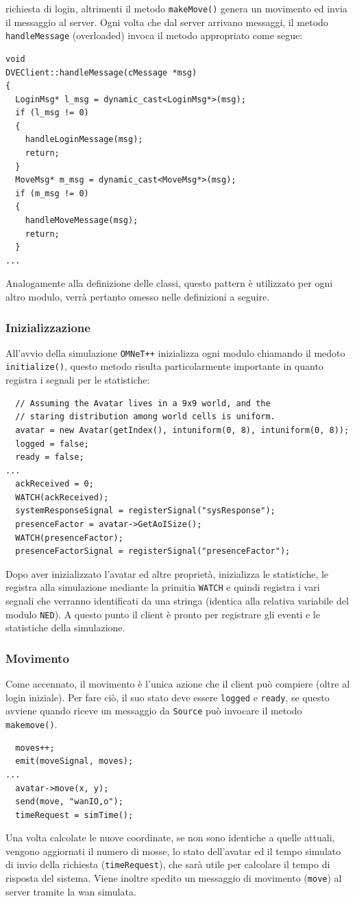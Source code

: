 \documentclass[a4paper, 11pt, oneside]{book}
\newcommand{\files}[1]{\texttt{#1}}
\theoremstyle{definition}
\theoremstyle{remark}
\begin{document}
richiesta di login, altrimenti il metodo \texttt{makeMove()} genera un movimento
ed invia il messaggio al server. Ogni volta che dal server arrivano messaggi,
il metodo \files{handleMessage} (overloaded) invoca il metodo appropriato
come segue:
\begin{lstlisting}
void
DVEClient::handleMessage(cMessage *msg)
{
  LoginMsg* l_msg = dynamic_cast<LoginMsg*>(msg);
  if (l_msg != 0)
  {
    handleLoginMessage(msg);
    return;
  }
  MoveMsg* m_msg = dynamic_cast<MoveMsg*>(msg);
  if (m_msg != 0)
  {
    handleMoveMessage(msg);
    return;
  }
...
\end{lstlisting}
Analogamente alla definizione delle classi, questo pattern è utilizzato per ogni
altro modulo, verrà pertanto omesso nelle definizioni a seguire.
\subsubsection{Inizializzazione}
All'avvio della simulazione \texttt{OMNeT++} inizializza ogni modulo chiamando
il medoto \texttt{initialize()}, questo metodo risulta particolarmente
importante in quanto registra i segnali per le statistiche:
\begin{lstlisting}
  // Assuming the Avatar lives in a 9x9 world, and the
  // staring distribution among world cells is uniform.
  avatar = new Avatar(getIndex(), intuniform(0, 8), intuniform(0, 8));
  logged = false;
  ready = false;
...
  ackReceived = 0;
  WATCH(ackReceived);
  systemResponseSignal = registerSignal("sysResponse");
  presenceFactor = avatar->GetAoISize();
  WATCH(presenceFactor);
  presenceFactorSignal = registerSignal("presenceFactor");
\end{lstlisting}
Dopo aver inizializzato l'avatar ed altre proprietà, inizializza le statistiche,
le registra alla simulazione mediante la primitia \texttt{WATCH} e quindi
registra i vari segnali che verranno identificati da una stringa (identica
alla relativa variabile del modulo \texttt{NED}). A questo punto il client è
pronto per registrare gli eventi e le statistiche della simulazione.

\subsubsection{Movimento}
Come accennato, il movimento è l'unica azione che il client può compiere
(oltre al login iniziale). Per fare ciò, il suo stato deve essere
\texttt{logged} e \texttt{ready}, se questo avviene quando riceve un messaggio
da \texttt{Source} può invocare il metodo \texttt{makemove()}.
\begin{lstlisting}
  moves++;
  emit(moveSignal, moves);
...
  avatar->move(x, y);
  send(move, "wanIO,o");
  timeRequest = simTime();
\end{lstlisting}
Una volta calcolate le nuove coordinate, se non sono identiche a quelle
attuali, vengono aggiornati il numero di mosse, lo stato dell'avatar ed il
tempo simulato di invio della richiesta
(\texttt{timeRequest}), che sarà utile per calcolare il
tempo di risposta del sistema. Viene inoltre spedito un messaggio di movimento
(\texttt{move}) al server tramite la wan simulata.
\end{document}

